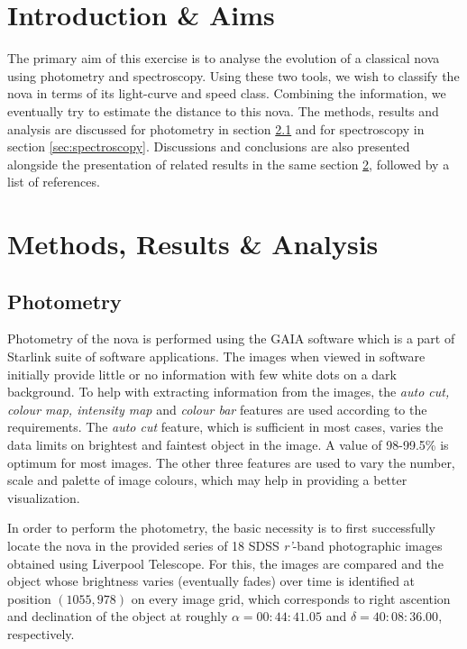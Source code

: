 \documentclass{tda}
\begin{document}
\section{Introduction \& Aims}
The primary aim of this exercise is to analyse the evolution of a classical nova using photometry and spectroscopy. Using these two tools, we wish to classify the nova in terms of its light-curve and speed class. Combining the information, we eventually try to estimate the distance to this nova. The methods, results and analysis are discussed for photometry in section \ref{sec:photometry} and for spectroscopy in section \ref{sec:spectroscopy}. Discussions and conclusions are also presented alongside the presentation of related results in the same section \ref{sec:everything}, followed by a list of references.

\section{Methods, Results \& Analysis} \label{sec:everything}

	\subsection{Photometry} \label{sec:photometry}

	Photometry of the nova is performed using the GAIA software which is a part of Starlink suite of software applications. The images when viewed in software initially provide little or no information with few white dots on a dark background. To help with extracting information from the images, the \emph{auto cut, colour map, intensity map} and \emph{colour bar} features are used according to the requirements. The \emph{auto cut} feature, which is sufficient in most cases, varies the data limits on brightest and faintest object in the image. A value of 98-99.5\% is optimum for most images. The other three features are used to vary the number, scale and palette of image colours, which may help in providing a better visualization. 

	In order to perform the photometry, the basic necessity is to first successfully locate the nova in the provided series of 18 SDSS \textit{r'}-band photographic images obtained using Liverpool Telescope. For this, the images are compared and the object whose brightness varies (eventually fades) over time is identified at position \((1055,978)\) on every image grid, which corresponds to right ascention and declination of the object at roughly \(\alpha = 00:44:41.05\) and \(\delta = 40:08:36.00\), respectively. 
\end{document}
